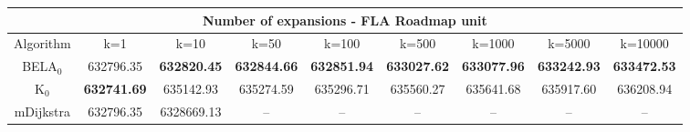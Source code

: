 \begin{tabular}{c|cccccccc}\toprule
\multicolumn{9}{c}{Number of expansions - FLA Roadmap unit}\\ \midrule
Algorithm & k=1 & k=10 & k=50 & k=100 & k=500 & k=1000 & k=5000 & k=10000 \\ \midrule
BELA$_0$ & 632796.35 & \textbf{632820.45} & \textbf{632844.66} & \textbf{632851.94} & \textbf{633027.62} & \textbf{633077.96} & \textbf{633242.93} & \textbf{633472.53} \\
K$_0$ & \textbf{632741.69} & 635142.93 & 635274.59 & 635296.71 & 635560.27 & 635641.68 & 635917.60 & 636208.94 \\
mDijkstra & 632796.35 & 6328669.13 & -- & -- & -- & -- & -- & -- \\ \bottomrule 
\end{tabular}
